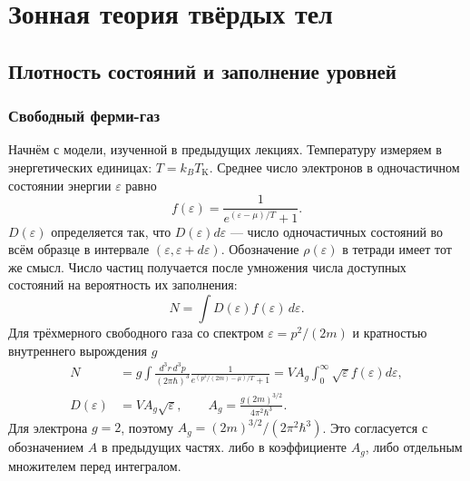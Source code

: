 \documentclass[../final.tex]{subfiles}
\begin{document}
\ifSubfilesClassLoaded{\setcounter{chapter}{1}\setcounter{section}{13}}{}

\chapter{Зонная теория твёрдых тел}

\section{Плотность состояний и заполнение уровней}
\subsection{Свободный ферми-газ}
Начнём с модели, изученной в предыдущих лекциях. Температуру измеряем
в энергетических единицах: $T=k_BT_{\mathrm{K}}$. Среднее число электронов
в одночастичном состоянии энергии $\varepsilon$ равно
\begin{equation*}
 f(\varepsilon)=\frac{1}{e^{(\varepsilon-\mu)/T}+1}.
\end{equation*}
 $D(\varepsilon)$ определяется так, что
$D(\varepsilon)d\varepsilon$ --- число одночастичных состояний во всём
образце в интервале $(\varepsilon,\varepsilon+d\varepsilon)$.
Обозначение $\rho(\varepsilon)$ в тетради имеет тот же смысл.
Число частиц получается после умножения числа доступных состояний
на вероятность их заполнения:
\begin{equation*}
 N=\int D(\varepsilon)f(\varepsilon)\,d\varepsilon.
\end{equation*}
Для трёхмерного свободного газа со спектром $\varepsilon=p^2/(2m)$
и кратностью внутреннего вырождения $g$
\begin{align*}
 N&=g\int\frac{d^3r\,d^3p}{(2\pi\hbar)^3}
 \frac1{e^{(p^2/(2m)-\mu)/T}+1}
 =VA_g\int_0^\infty\sqrt\varepsilon f(\varepsilon)d\varepsilon,\\
 D(\varepsilon)&=VA_g\sqrt\varepsilon,\qquad
 A_g=\frac{g(2m)^{3/2}}{4\pi^2\hbar^3}.
\end{align*}
Для электрона $g=2$, поэтому $A_g=(2m)^{3/2}/(2\pi^2\hbar^3)$.
Это согласуется с обозначением $A$ в предыдущих частях.
 либо в коэффициенте $A_g$,
либо отдельным множителем перед интегралом.
\end{document}
